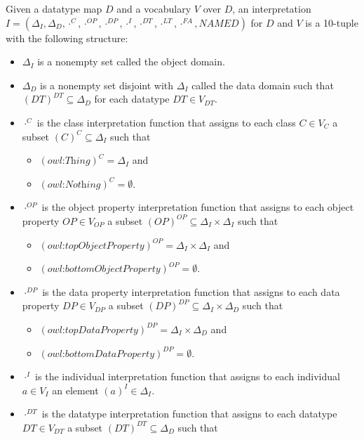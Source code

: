 \documentclass[10pt,fleqn,final]{scrreprt}
\newenvironment{definitions}[0]{\medskip }{}
\begin{document}
\begin{definitions}
\begin{definition}
Given a datatype map $D$ and a vocabulary $V$ over $D$, an interpretation $I = ( \Delta_I , \Delta_D , \cdot^{C} , \cdot^{OP} , \cdot^{DP} , \cdot^{I} , \cdot^{DT} , \cdot^{LT} , \cdot^{FA} , \mathit{NAMED} )$ for $D$ and $V$ is a 10-tuple with the following structure:
\begin{itemize}
\item
    $\Delta_I$ is a nonempty set called the object domain.
\item
    $\Delta_D$ is a nonempty set disjoint with $\Delta_I$ called the data domain such that $(DT)^{DT} \subseteq \Delta_D$ for each datatype $DT \in V_{DT}$.
\item
    $\cdot^{C}$ is the class interpretation function that assigns to each class $C \in V_{C}$ a subset $(C)^C \subseteq \Delta_I$ such that
\begin{itemize}
\item
        $(\textit{owl:Thing})^C = \Delta_I$ and
\item
        $(\textit{owl:Nothing})^C = \emptyset$. 
\end{itemize}
\item
    $\cdot^{OP}$ is the object property interpretation function that assigns to each object property $OP \in V_{OP}$ a subset $(OP)^{OP} \subseteq \Delta_I \times \Delta_I$ such that
\begin{itemize}
\item
        $(\textit{owl:topObjectProperty})^{OP} = \Delta_I \times \Delta_I$ and
\item
        $(\textit{owl:bottomObjectProperty})^{OP} = \emptyset$. 
\end{itemize}
\item
    $\cdot^{DP}$ is the data property interpretation function that assigns to each data property $DP \in V_{DP}$ a subset $(DP)^{DP} \subseteq \Delta_I \times \Delta_D$ such that
\begin{itemize}
\item
        $(\textit{owl:topDataProperty})^{DP} = \Delta_I \times \Delta_D$ and
\item
        $(\textit{owl:bottomDataProperty})^{DP} = \emptyset$. 
\end{itemize}
\item
    $\cdot^{I}$ is the individual interpretation function that assigns to each individual $a \in V_{I}$ an element $(a)^{I} \in \Delta_I$.
\item
    $\cdot^{DT}$ is the datatype interpretation function that assigns to each datatype $DT \in V_{DT}$ a subset $(DT)^{DT} \subseteq \Delta_D$ such that

\end{itemize}
\end{definition}
\end{definitions}
\end{document}

